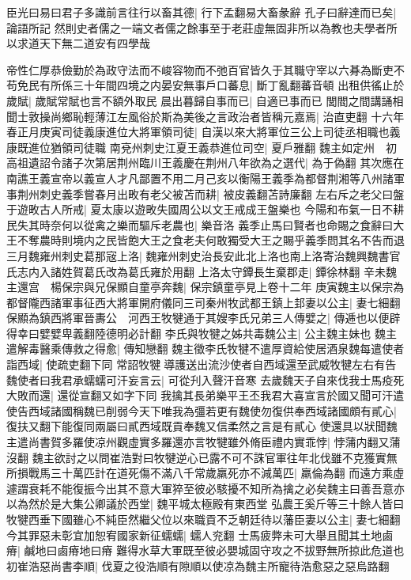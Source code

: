 臣光曰易曰君子多識前言往行以畜其德|{
	行下孟翻易大畜彖辭}
孔子曰辭達而已矣|{
	論語所記}
然則史者儒之一端文者儒之餘事至于老莊虛無固非所以為教也夫學者所以求道天下無二道安有四學哉

帝性仁厚恭儉勤於為政守法而不峻容物而不弛百官皆久于其職守宰以六朞為斷吏不苟免民有所係三十年間四境之内晏安無事戶口蕃息|{
	斷丁亂翻蕃音頓}
出租供徭止於歲賦|{
	歲賦常賦也言不額外取民}
晨出暮歸自事而已|{
	自適已事而已}
閭閻之間講誦相聞士敦操尚鄉恥輕薄江左風俗於斯為美後之言政治者皆稱元嘉焉|{
	治直吏翻}
十六年春正月庚寅司徒義康進位大將軍領司徒|{
	自漢以來大將軍位三公上司徒丞相職也義康既進位猶領司徒職}
南兗州刺史江夏王義恭進位司空|{
	夏戶雅翻}
魏主如定州　初高祖遺詔令諸子次第居荆州臨川王義慶在荆州八年欲為之選代|{
	為于偽翻}
其次應在南譙王義宣帝以義宣人才凡鄙置不用二月己亥以衡陽王義季為都督荆湘等八州諸軍事荆州刺史義季嘗春月出畋有老父被苫而耕|{
	被皮義翻苫詩廉翻}
左右斥之老父曰盤于遊畋古人所戒|{
	夏太康以遊畋失國周公以文王戒成王盤樂也}
今陽和布氣一日不耕民失其時奈何以從禽之樂而驅斥老農也|{
	樂音洛}
義季止馬曰賢者也命賜之食辭曰大王不奪農時則境内之民皆飽大王之食老夫何敢獨受大王之賜乎義季問其名不告而退　三月魏雍州刺史葛那宼上洛|{
	魏雍州刺史治長安此北上洛也南上洛寄治魏興魏書官氏志内入諸姓賀葛氏改為葛氏雍於用翻}
上洛太守鐔長生棄郡走|{
	鐔徐林翻}
辛未魏主還宫　楊保宗與兄保顯自童亭奔魏|{
	保宗鎮童亭見上卷十二年}
庚寅魏主以保宗為都督隴西諸軍事征西大將軍開府儀同三司秦州牧武都王鎮上邽妻以公主|{
	妻七細翻}
保顯為鎮西將軍晉夀公　河西王牧犍通于其嫂李氏兄弟三人傳嬖之|{
	傳逓也以便辟得幸曰嬖嬖卑義翻陸德明必計翻}
李氏與牧犍之姊共毒魏公主|{
	公主魏主妹也}
魏主遣解毒醫乘傳救之得愈|{
	傳知戀翻}
魏主徵李氏牧犍不遣厚資給使居酒泉魏每遣使者詣西域|{
	使疏吏翻下同}
常詔牧犍導護送出流沙使者自西域還至武威牧犍左右有告魏使者曰我君承蠕蠕可汗妄言云|{
	可從刋入聲汗音寒}
去歲魏天子自來伐我士馬疫死大敗而還|{
	還從宣翻又如字下同}
我擒其長弟樂平王丕我君大喜宣言於國又聞可汗遣使告西域諸國稱魏已削弱今天下唯我為彊若更有魏使勿復供奉西域諸國頗有貳心|{
	復扶又翻下能復同兩屬曰貳西域既貢奉魏又信柔然之言是有貳心}
使還具以狀聞魏主遣尚書賀多羅使凉州觀虛實多羅還亦言牧犍雖外脩臣禮内實乖悖|{
	悖蒲内翻又蒲沒翻}
魏主欲討之以問崔浩對曰牧犍逆心已露不可不誅官軍往年北伐雖不克獲實無所損戰馬三十萬匹計在道死傷不滿八千常歲羸死亦不減萬匹|{
	羸倫為翻}
而遠方乘虛遽謂衰耗不能復振今出其不意大軍猝至彼必駭擾不知所為擒之必矣魏主曰善吾意亦以為然於是大集公卿議於西堂|{
	魏平城太極殿有東西堂}
弘農王奚斤等三十餘人皆曰牧犍西垂下國雖心不純臣然繼父位以來職貢不乏朝廷待以藩臣妻以公主|{
	妻七細翻}
今其罪惡未彰宜加恕宥國家新征蠕蠕|{
	蠕人兖翻}
士馬疲弊未可大舉且聞其土地鹵瘠|{
	鹹地曰鹵瘠地曰瘠}
難得水草大軍既至彼必嬰城固守攻之不拔野無所掠此危道也初崔浩惡尚書李順|{
	伐夏之役浩順有隙順以使凉為魏主所寵待浩愈惡之惡烏路翻}

